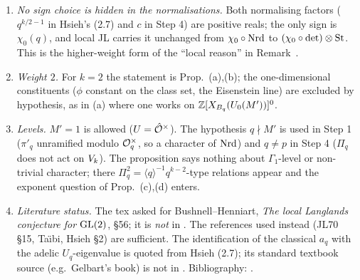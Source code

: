 \begin{remark}\label{rem:s05-signe}
\begin{enumerate}[label=(\alph*)]
\item \emph{No sign choice is hidden in the normalisations.} Both normalising factors ($q^{k/2-1}$ in Hsieh's (2.7) and $c$ in
  Step 4) are positive reals; the only sign is $\chi_0(q)$, and local JL carries it unchanged from $\chi_0\circ\mathrm{Nrd}$ to
  $(\chi_0\circ\det)\otimes\mathrm{St}$. This is the higher-weight form of the ``local reason'' in Remark~.
\item \emph{Weight $2$.} For $k=2$ the statement is Prop.~(a),(b); the one-dimensional constituents
  ($\phi$ constant on the class set, the Eisenstein line) are excluded by hypothesis, as in (a) where one works on
  $\mathbb{Z}[X_{B_q}(U_0(M'))]^0$.
\item \emph{Levels.} $M'=1$ is allowed ($U=\hat{\mathcal{O}}^\times$). The hypothesis $q\nmid M'$ is used in Step 1 ($\pi'_q$ unramified
  modulo $\mathcal{O}_q^\times$, so a character of $\mathrm{Nrd}$) and $q\ne p$ in Step 4 ($\Pi_q$ does not act on $V_k$). The proposition says
  nothing about $\Gamma_1$-level or non-trivial character; there $\Pi_q^2=\langle q\rangle^{-1}q^{k-2}$-type relations appear and
  the exponent question of Prop.~(c),(d) enters.
\item \emph{Literature status.} The tex asked for Bushnell--Henniart, \emph{The local Langlands conjecture for $\mathrm{GL}(2)$}, \S56; it
  is \emph{not} in . The references used instead (JL70 \S15, Ta\"\i bi, Hsieh \S2) are sufficient. The
  identification of the classical $a_q$ with the adelic $U_q$-eigenvalue is quoted from Hsieh (2.7); its standard textbook source
  (e.g.\ Gelbart's book) is not in . Bibliography: \cite{JL,Taibi22,Hs,Li75}.
\end{enumerate}
\end{remark}
